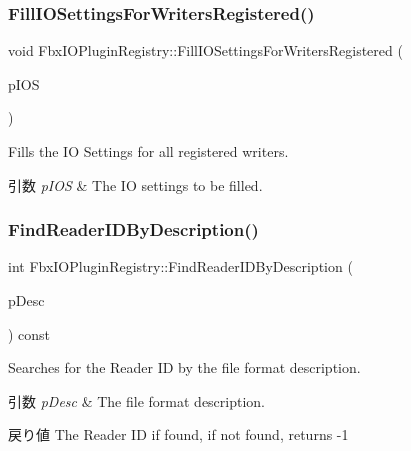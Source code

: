 \subsubsection{\texorpdfstring{Fill\+I\+O\+Settings\+For\+Writers\+Registered()}{FillIOSettingsForWritersRegistered()}}
{\footnotesize\ttfamily void Fbx\+I\+O\+Plugin\+Registry\+::\+Fill\+I\+O\+Settings\+For\+Writers\+Registered (\begin{DoxyParamCaption}\item[{\hyperlink{class_fbx_i_o_settings}{Fbx\+I\+O\+Settings} \&}]{p\+I\+OS }\end{DoxyParamCaption})}

Fills the IO Settings for all registered writers. 
\begin{DoxyParams}{引数}
{\em p\+I\+OS} & The IO settings to be filled. \\
\hline
\end{DoxyParams}
\mbox{\label{class_fbx_i_o_plugin_registry_afe4efa15bdb7a8963b77527453222811}} 
\subsubsection{\texorpdfstring{Find\+Reader\+I\+D\+By\+Description()}{FindReaderIDByDescription()}}
{\footnotesize\ttfamily int Fbx\+I\+O\+Plugin\+Registry\+::\+Find\+Reader\+I\+D\+By\+Description (\begin{DoxyParamCaption}\item[{const char $\ast$}]{p\+Desc }\end{DoxyParamCaption}) const}

Searches for the Reader ID by the file format description. 
\begin{DoxyParams}{引数}
{\em p\+Desc} & The file format description. \\
\hline
\end{DoxyParams}
\begin{DoxyReturn}{戻り値}
The Reader ID if found, if not found, returns -\/1 
\end{DoxyReturn}
\mbox{\label{class_fbx_i_o_plugin_registry_a49fd69a6818279573cdab5cf86861ca3}} 
